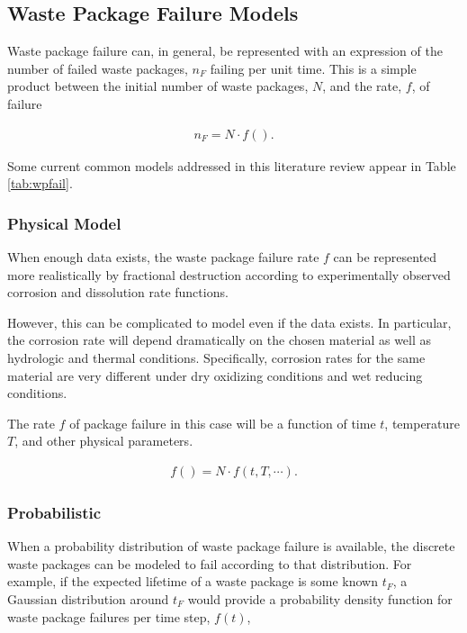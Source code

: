 
\subsection{Waste Package Failure Models}

Waste package failure can, in general, be represented with an expression of the 
number of failed waste packages, $n_F$ failing per unit time. This is a simple 
product between the initial number of waste packages, $N$, and the rate, $f$, of 
failure

\begin{align}
  n_F = N\cdot f().
  \label{rate}
\end{align}

Some current common models addressed in this literature review appear in Table 
\ref{tab:wpfail}.




\subsubsection{Physical Model}

When enough data exists, the waste package failure rate $f$ can
be represented more realistically by fractional destruction according to
experimentally observed corrosion and dissolution rate functions.

However, this can be complicated to model even if the data exists. In
particular, the corrosion rate will depend dramatically on the chosen material 
as well as hydrologic and thermal conditions. Specifically, corrosion rates for 
the same material are very different under dry oxidizing conditions and wet 
reducing conditions. 

The rate $f$ of package  failure in this case will be a function of time $t$, 
temperature $T$, and other physical parameters.

\begin{align}
  f() = N\cdot f(t,T,\cdots).
  \label{rate}
\end{align}

\subsubsection{Probabilistic}

When a probability distribution of waste package failure is available, the 
discrete waste packages can be modeled to fail according to that distribution. 
For example, if the expected lifetime of a waste package is some known $t_F$, a 
Gaussian distribution around $t_F$ would provide a probability density function 
for waste package failures per time step, $f(t)$,

